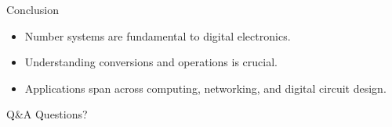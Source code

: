 \documentclass{beamer}
\begin{document}
\begin{frame}{Conclusion}
    \begin{itemize}
        \item Number systems are fundamental to digital electronics.
        \item Understanding conversions and operations is crucial.
        \item Applications span across computing, networking, and digital circuit design.
    \end{itemize}
\end{frame}

\begin{frame}{Q&A}
    \centering
    Questions?
\end{frame}
\end{document}
